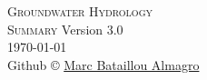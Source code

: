 \documentclass[landscape]{article}
\newcommand{\version}{3.0}
\begin{document}
\setlength{\abovedisplayskip}{1pt}
\setlength{\belowdisplayskip}{1pt}

\thispagestyle{empty}
\begin{center}
  \vspace*{\fill}
  \textsc{\Huge Groundwater Hydrology\\[2ex] \huge Summary}
  \vfill
  \footnotesize{
    Version \version\\[1ex]
    \today\\[1ex]
    Github \copyright{}
    \href{https://github.com/mbataillou?tab=repositories}{Marc Bataillou Almagro}\\
  }
\end{center}
\newpage

\thispagestyle{empty}
\begin{multicols*}{3}
  \tableofcontents
\end{multicols*}
\newpage
\end{document}
